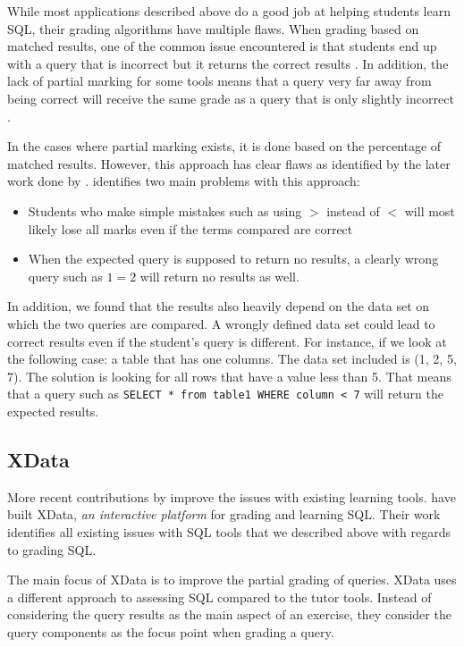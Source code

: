 While most applications described above do a good job at helping students learn SQL, their grading algorithms have multiple flaws. When grading based on matched results, one of the common issue encountered is that students end up with a query that is incorrect but it returns the correct results \citep{literature:assesql}. In addition, the lack of partial marking for some tools means that a query very far away from being correct will receive the same grade as a query that is only slightly incorrect \citep{literature:assesql}.

In the cases where partial marking exists, it is done based on the percentage of matched results. However, this approach has clear flaws as identified by the later work done by \cite{literature:xdata}. \cite{literature:xdata} identifies two main problems with this approach:

\begin{itemize}
    \item Students who make simple mistakes such as using $>$ instead of $<$ will most likely lose all marks even if the terms compared are correct
    \item When the expected query is supposed to return no results, a clearly wrong query such as $1 = 2$ will return no results as well.
\end{itemize}

In addition, we found that the results also heavily depend on the data set on which the two queries are compared. A wrongly defined data set could lead to correct results even if the student's query is different. For instance, if we look at the following case: a table that has one columns. The data set included is (1, 2, 5, 7). The solution is looking for all rows that have a value less than 5. That means that a query such as \texttt{SELECT * from table1 WHERE column < 7} will return the expected results.

\subsection{XData}

More recent contributions by \cite{literature:xdata} improve the issues with existing learning tools. \cite{literature:xdata} have built XData, \textit{an interactive platform} for grading and learning SQL. Their work identifies all existing issues with SQL tools that we described above with regards to grading SQL.

The main focus of XData is to improve the partial grading of queries. XData uses a different approach to assessing SQL compared to the tutor tools. Instead of considering the query results as the main aspect of an exercise, they consider the query components as the focus point when grading a query.

